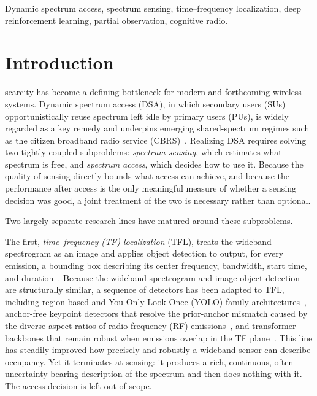 \documentclass[journal]{IEEEtran}
\begin{document}
\begin{IEEEkeywords}
Dynamic spectrum access, spectrum sensing, time--frequency localization,
deep reinforcement learning, partial observation, cognitive radio.
\end{IEEEkeywords}
\section{Introduction}
\label{sec:introduction}

 scarcity has become a defining bottleneck for
modern and forthcoming wireless systems. Dynamic spectrum access (DSA),
in which secondary users (SUs) opportunistically reuse spectrum left idle by
primary users (PUs), is widely regarded as a key remedy and underpins
emerging shared-spectrum regimes such as the citizen broadband radio service
(CBRS)~\cite{sohul2015cbrs}. Realizing DSA requires solving two tightly
coupled subproblems: \emph{spectrum sensing}, which estimates what spectrum
is free, and \emph{spectrum access}, which decides how to use it. Because the
quality of sensing directly bounds what access can achieve, and because the
performance after access is the only meaningful measure of whether a sensing
decision was good, a joint treatment of the two is necessary rather than
optional.

Two largely separate research lines have matured around these subproblems.

The first, \emph{time--frequency (TF) localization} (TFL), treats the
wideband spectrogram as an image and applies object detection to output, for
every emission, a bounding box describing its center frequency, bandwidth,
start time, and duration~\cite{prasad2020,li2022hf}. Because the wideband
spectrogram and image object detection are structurally similar, a sequence
of detectors has been adapted to TFL, including region-based and You Only Look
Once (YOLO)-family architectures~\cite{prasad2020,li2022hf}, anchor-free
keypoint detectors that resolve the prior-anchor mismatch caused by the diverse
aspect ratios of radio-frequency (RF) emissions~\cite{zhao2024uav}, and transformer backbones that remain robust
when emissions overlap in the TF plane~\cite{zhao2025trtfl_ssl,
zhang2024spectrumtransformer}. This line has steadily improved how precisely
and robustly a wideband sensor can describe occupancy. Yet it terminates at
sensing: it produces a rich, continuous, often uncertainty-bearing
description of the spectrum and then does nothing with it. The access
decision is left out of scope.
\end{document}
